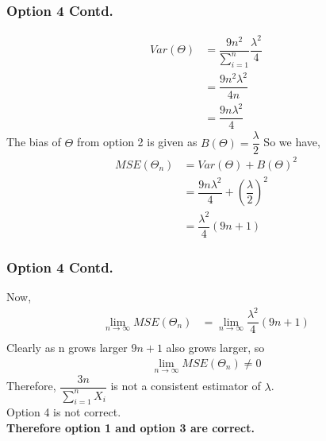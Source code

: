 \documentclass{beamer}
\providecommand{\brak}[1]{\ensuremath{\left(#1\right)}}
\begin{document}
 \begin{frame}
 \frametitle{Option 4 Contd.}
\begin{align}
     Var(\Theta) &= \dfrac{9n^2}{ \sum_{i=1}^{n}} \dfrac{\lambda^2}{4} \\
     & = \dfrac{9n^2 \lambda^2}{4n } \\
     & = \dfrac{9n \lambda^2}{4 }
\end{align}
The bias of $ \Theta $ from option 2 is given as $ B(\Theta) = \dfrac{\lambda}{2} $
So we have,
\begin{align}
    MSE(\Theta_n) &= Var(\Theta) + B(\Theta)^2 \\
    &= \dfrac{9n \lambda^2}{4 } + \brak{\dfrac{\lambda}{2}}^2 \\
    & = \dfrac{ \lambda^2}{4 } (9n+1)
\end{align}
 \end{frame}

\begin{frame}
 \frametitle{Option 4 Contd.}
Now,
\begin{align}
     \lim_{n\to\infty} MSE( \Theta_n) &=    \lim_{n\to\infty} \dfrac{ \lambda^2}{4 } (9n+1) \\
\end{align}
Clearly as n grows larger $ 9n+1$ also grows larger, so
\begin{align}
     \lim_{n\to\infty} MSE( \Theta_n) \neq 0   
\end{align}
Therefore, $\dfrac{3n}{\sum_{i=1}^{n} X_i} $ is not a consistent estimator of $ \lambda$. \\
Option 4 is not correct. \\
\textbf{Therefore option 1 and option 3 are correct.}
\end{frame}
\end{document}
